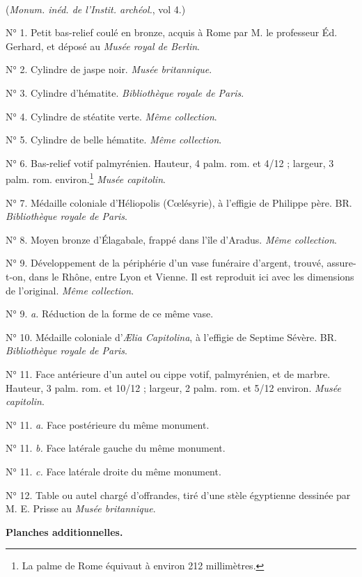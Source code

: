 \documentclass[a4paper, 11pt, oneside, polutonikogreek, french]{article}
\begin{document}
\paragraph{}
(\emph{Monum. inéd. de l'Instit. archéol.}, vol 4.)

N° 1. Petit bas-relief coulé en bronze, acquis à Rome par M. le professeur Éd. Gerhard, et déposé au \emph{Musée royal de Berlin}.

N° 2. Cylindre de jaspe noir. \emph{Musée britannique}.

N° 3. Cylindre d'hématite. \emph{Bibliothèque royale de Paris}.

N° 4. Cylindre de stéatite verte. \emph{Même collection}.

N° 5. Cylindre de belle hématite. \emph{Même collection}.

N° 6. Bas-relief votif palmyrénien. Hauteur, 4 palm. rom. et 4/12 ; largeur, 3 palm. rom. environ.\footnote{La palme de Rome équivaut à environ 212 millimètres.} \emph{Musée capitolin}.

N° 7. Médaille coloniale d'Héliopolis (Cœlésyrie), à l'effigie de Philippe père. BR. \emph{Bibliothèque royale de Paris}.

N° 8. Moyen bronze d'Élagabale, frappé dans l'île d'Aradus. \emph{Même collection}.

N° 9. Développement de la périphérie d'un vase funéraire d'argent, trouvé, assure-t-on, dans le Rhône, entre Lyon et Vienne. Il est reproduit ici avec les dimensions de l'original. \emph{Même collection}.

N° 9. \emph{a.} Réduction de la forme de ce même vase.

N° 10. Médaille coloniale d'\emph{Ælia Capitolina}, à l'effigie de Septime Sévère. BR. \emph{Bibliothèque royale de Paris}.

N° 11. Face antérieure d'un autel ou cippe votif, palmyrénien, et de marbre. Hauteur, 3 palm. rom. et 10/12 ; largeur, 2 palm. rom. et 5/12 environ. \emph{Musée capitolin}.

N° 11. \emph{a.} Face postérieure du même monument.

N° 11. \emph{b.} Face latérale gauche du même monument.

N° 11. \emph{c.} Face latérale droite du même monument.

N° 12. Table ou autel chargé d'offrandes, tiré d'une stèle égyptienne dessinée par M. E. Prisse au \emph{Musée britannique}.
\clearpage
\begin{center}
\textbf{Planches additionnelles.}
\end{center}
\end{document}
